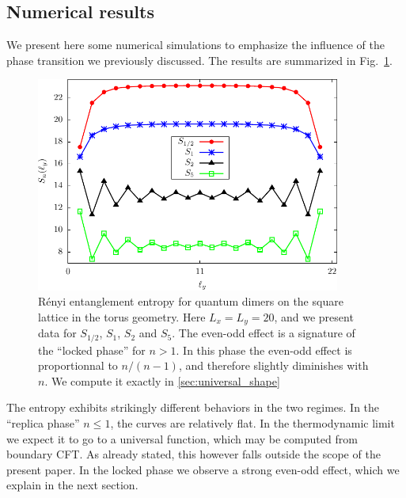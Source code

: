 \documentclass[11pt]{iopart}
\begin{document}
\subsection{Numerical results}
We present here some numerical simulations to emphasize the influence of the phase transition we previously discussed. The results are summarized in Fig.~\ref{fig:ee_d_torus}. 
\begin{figure}[htbp]
 \begin{center}
 \includegraphics[width=10cm]{./figures/ee_d_torus.pdf}
 \end{center}
\caption{R\'enyi entanglement entropy for quantum dimers on the square lattice in the torus geometry. Here $L_x=L_y=20$, and we present data for $S_{1/2}$, $S_1$, $S_2$ and $S_5$. The even-odd effect is a signature of the ``locked phase'' for $n>1$. In this phase the even-odd effect is proportionnal to $n/(n-1)$, and therefore slightly diminishes with $n$. We compute it exactly in \ref{sec:universal_shape}}
\label{fig:ee_d_torus}
\end{figure}
The entropy exhibits strikingly different behaviors in the two regimes. In the ``replica phase'' $n \leq 1$, the curves are relatively flat. In the thermodynamic limit we expect it to go to a universal function, which may be computed from boundary CFT. As already stated, this however falls outside the scope of the present paper. In the locked phase we observe a strong even-odd effect, which we explain in the next section.  
\end{document}
